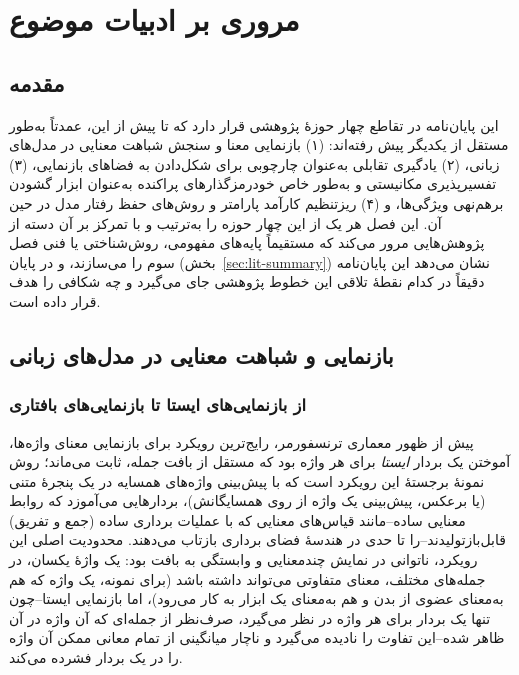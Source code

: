 
\chapter{مروری بر ادبیات موضوع}
\label{ch:litreview}

\section{مقدمه}
این پایان‌نامه در تقاطع چهار حوزهٔ پژوهشی قرار دارد که تا پیش از این، عمدتاً به‌طور مستقل از یکدیگر پیش رفته‌اند: (۱) بازنمایی معنا و سنجش شباهت معنایی در مدل‌های زبانی، (۲) یادگیری تقابلی به‌عنوان چارچوبی برای شکل‌دادن به فضاهای بازنمایی، (۳) تفسیرپذیری مکانیستی و به‌طور خاص خودرمزگذارهای پراکنده به‌عنوان ابزار گشودن برهم‌نهی ویژگی‌ها، و (۴) ریزتنظیم کارآمد پارامتر و روش‌های حفظ رفتار مدل در حین آن. این فصل هر یک از این چهار حوزه را به‌ترتیب و با تمرکز بر آن دسته از پژوهش‌هایی مرور می‌کند که مستقیماً پایه‌های مفهومی، روش‌شناختی یا فنی فصل سوم را می‌سازند، و در پایان (بخش~\ref{sec:lit-summary}) نشان می‌دهد این پایان‌نامه دقیقاً در کدام نقطهٔ تلاقی این خطوط پژوهشی جای می‌گیرد و چه شکافی را هدف قرار داده است.

\section{بازنمایی و شباهت معنایی در مدل‌های زبانی}
\label{sec:lit-representation}

\subsection{از بازنمایی‌های ایستا تا بازنمایی‌های بافتاری}
پیش از ظهور معماری ترنسفورمر، رایج‌ترین رویکرد برای بازنمایی معنای واژه‌ها، آموختن یک بردار \emph{ایستا}
برای هر واژه بود که مستقل از بافت جمله، ثابت می‌ماند؛ روش
~\cite{mikolov2013word2vec}
نمونهٔ برجستهٔ این رویکرد است که با پیش‌بینی واژه‌های همسایه در یک پنجرهٔ متنی (یا برعکس، پیش‌بینی یک واژه از روی همسایگانش)، بردارهایی می‌آموزد که روابط معنایی ساده--مانند قیاس‌های معنایی که با عملیات برداری ساده (جمع و تفریق) قابل‌بازتولیدند--را تا حدی در هندسهٔ فضای برداری بازتاب می‌دهند. محدودیت اصلی این رویکرد، ناتوانی در نمایش چندمعنایی
و وابستگی به بافت بود: یک واژهٔ یکسان، در جمله‌های مختلف، معنای متفاوتی می‌تواند داشته باشد (برای نمونه، یک واژه که هم به‌معنای عضوی از بدن و هم به‌معنای یک ابزار به کار می‌رود)، اما بازنمایی ایستا--چون تنها یک بردار برای هر واژه در نظر می‌گیرد، صرف‌نظر از جمله‌ای که آن واژه در آن ظاهر شده--این تفاوت را نادیده می‌گیرد و ناچار میانگینی از تمام معانی ممکن آن واژه را در یک بردار فشرده می‌کند.

